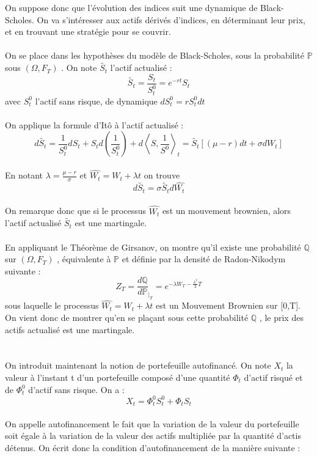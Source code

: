 \documentclass[french,12pt,a4paper]{article}
\begin{document}
On suppose donc que l'évolution des indices suit une dynamique de Black-Scholes. On va s'intéresser aux actifs dérivés d'indices, en déterminant leur prix, et en trouvant une stratégie pour se couvrir. \\ \\
On se place dans les hypothèses du modèle de Black-Scholes, sous la probabilité $\mathbb{P} $ sous $( \Omega , F_T ) $ . On note $\widetilde{S_{t}}$ l'actif actualisé :
$$\widetilde{S_{t}} = \frac{S_{t}}{S_{t}^0} = e^{-rt}S_{t} $$
avec $S_{t}^0$ l'actif sans risque, de dynamique  $ dS_{t}^0 = rS_{t}^{0}dt $ \\ \\
On applique la formule d'Itô à l'actif actualisé :
$$ d \widetilde{S_{t}} = \frac{1}{S_{t}^0}dS_{t} + S_{t}d \left(\frac{1}{S_{t}^0} \right) + d \left\langle S, \frac{1}{S^0} \right\rangle_{t} = \widetilde{S_{t}} \left[ (\mu - r)dt + \sigma dW_{t} \right] 	$$ \\
En notant  $\lambda = \frac{\mu - r}{\sigma}$ et $ \widehat{W_{t}} = W_{t} + \lambda t $ on trouve
$$ d \widetilde{S_{t}} = \sigma \widetilde{S_{t}} d \widehat{W_{t}} $$ \\
On remarque donc que si le processus $ \widehat{W_{t}} $ est un mouvement brownien, alors l'actif actualisé $ \widetilde{S_t} $ est une martingale. \\ \\
En appliquant le Théorème de Girsanov, on montre qu'il existe une probabilité $ \mathbb{Q} $ sur $ ( \Omega , F_{T} ) $ , équivalente à $ \mathbb{P} $ et définie par la densité de Radon-Nikodym suivante :
$$ Z_{T} = \frac{d\mathbb{Q}}{d\mathbb{P}}_{\mid_{T}} = e^{-\lambda W_{T} - \frac{\lambda^2}{2}T}  	$$
sous laquelle le processus $ \widehat{W_{t}} = W_{t} + \lambda t $  est un Mouvement Brownien sur [0,T]. \\
On vient donc de montrer qu'en se plaçant sous cette probabilité $ \mathbb{Q} $ , le prix des actifs actualisé est une martingale. \\ \\ \\
On introduit maintenant la notion de portefeuille autofinancé. On note $ X_{t} $ la valeur à l'instant t d'un portefeuille composé d'une quantité $ \Phi_t $ d'actif risqué et de $ \Phi_{t}^0 $ d'actif sans risque. On a :
$$ X_t = \Phi_{t}^0 S_{t}^0  + \Phi_t S_{t}  $$ \\
On appelle autofinancement le fait que la variation de la valeur du portefeuille soit égale à la variation de la valeur des actifs multipliée par la quantité d'actis détenus. On écrit donc la condition d'autofinancement de la manière suivante :
\end{document}
